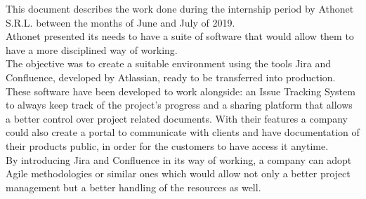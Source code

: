 
This document describes the work done during the internship period by Athonet S.R.L. between the months of June and July of 2019.\\
Athonet presented its needs to have a suite of software that would allow them to have a more disciplined way of working.\\
The objective was to create a suitable environment using the tools Jira and Confluence, developed by Atlassian, ready to be transferred into production.\\
These software have been developed to work alongside: an Issue Tracking System to always keep track of the project's progress and a sharing platform that allows a better control over project related documents.
With their features a company could also create a portal to communicate with clients and have documentation of their products public, in order for the customers to have access it anytime.\\
By introducing Jira and Confluence in its way of working, a company can adopt Agile methodologies or similar ones which would allow not only a better project management but a better handling of the resources as well.